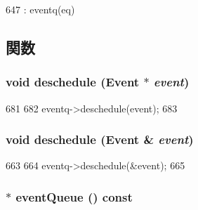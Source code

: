 \begin{DoxyCode}
647 : eventq(eq) {}
\end{DoxyCode}


\subsection{関数}
\hypertarget{classEventManager_ab1b8fc2b2605fdc1d88bf07a86e1fe07}{
\subsubsection[{deschedule}]{\setlength{\rightskip}{0pt plus 5cm}void deschedule ({\bf Event} $\ast$ {\em event})}}
\label{classEventManager_ab1b8fc2b2605fdc1d88bf07a86e1fe07}



\begin{DoxyCode}
681     {
682         eventq->deschedule(event);
683     }
\end{DoxyCode}
\hypertarget{classEventManager_a720e34da4db679fb3f30b20e55c23605}{
\subsubsection[{deschedule}]{\setlength{\rightskip}{0pt plus 5cm}void deschedule ({\bf Event} \& {\em event})}}
\label{classEventManager_a720e34da4db679fb3f30b20e55c23605}



\begin{DoxyCode}
663     {
664         eventq->deschedule(&event);
665     }
\end{DoxyCode}
\hypertarget{classEventManager_ad6e91e91036b003cf3661959078e677f}{
\subsubsection[{eventQueue}]{$\ast$ eventQueue () const}}
\label{classEventManager_ad6e91e91036b003cf3661959078e677f}



